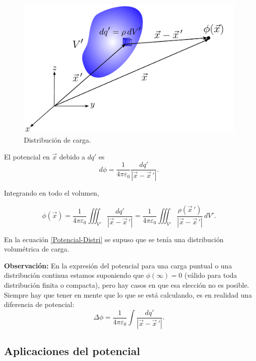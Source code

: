 \begin{figure}[H]
    \centering
    \includegraphics[scale = 0.6]{Figuras/Distribucion-Cargas-Potencial.pdf}
    \caption{Distribución de carga.}
    \label{fig:Distribu-Carga-2}
\end{figure}

El potencial en $\Vec{x}$ debido a $dq'$ es
\begin{equation*}
d\phi = \frac{1}{4\pi\varepsilon_0} \frac{dq'}{|\vec{x} - \vec{x}\,'|}.
\end{equation*}

Integrando en todo el volumen,
\begin{shaded}
\begin{equation}
   \phi(\vec{x}) = \frac{1}{4\pi\varepsilon_0} \iiint_{V'} \frac{dq'}{|\vec{x} - \vec{x}\,'|} = \frac{1}{4\pi\varepsilon_0} \iiint_{V'} \frac{\rho(\vec{x}\,')}{|\vec{x} - \vec{x}\,'|} \,dV'. \label{Potencial-Distri}
\end{equation}
\end{shaded}

En la ecuación \eqref{Potencial-Distri} se supuso que se tenía una distribución volumétrica de carga.

\textbf{Observación:} En la expresión del potencial para una carga puntual o una distribución continua estamos suponiendo que $\phi(\infty) = 0$ (válido para toda distribución finita o compacta), pero hay casos en que esa elección no es posible. Siempre hay que tener en mente que lo que se está calculando, es en realidad una diferencia de potencial:
$$\Delta \phi = \frac{1}{4\pi \varepsilon_0} \int \frac{dq'}{|\vec{x} - \vec{x}\,'|}.$$

\subsection{Aplicaciones del potencial}

